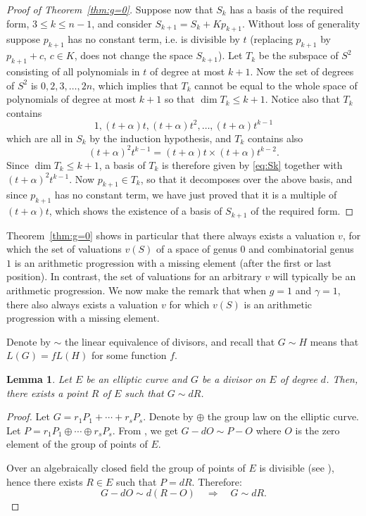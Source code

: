 \documentclass{article}
\theoremstyle{plain}
\newtheorem{lemma}[thm]{Lemma}
\theoremstyle{definition}
\theoremstyle{remark}
\renewcommand{\leq}{\leqslant}
\begin{document}
\begin{proof}[Proof of Theorem~\ref{thm:g=0}]
Suppose now that $S_k$ has a basis of the required form, $3\leq k\leq n-1$, and
consider $S_{k+1}=S_k+Kp_{k+1}$. Without loss of generality suppose
$p_{k+1}$ has no constant term, i.e. is divisible by $t$ (replacing
$p_{k+1}$ by $p_{k+1}+c$, $c\in K$, does not change the space $S_{k+1}$).
Let $T_k$ be the subspace
of $S^2$ consisting of all polynomials in $t$ of degree at most
$k+1$. Now the set of degrees of $S^2$ is
$0,2,3,\ldots,2n$, which implies that $T_k$ cannot be equal to the
whole space of polynomials of degree at most $k+1$ so that $\dim T_k\leq k+1$.
Notice also that $T_k$ contains
\begin{equation}
  \label{eq:Sk}
  1,(t+\alpha)t,(t+\alpha)t^2,\ldots ,(t+\alpha)t^{k-1}
\end{equation}
which are all in $S_k$ by the induction hypothesis, and $T_k$
contains also 
$$(t+\alpha)^2t^{k-1} = (t+\alpha)t \times (t+\alpha)t^{k-2}.$$
Since $\dim T_k\leq k+1$, a basis of $T_k$ is therefore given by \eqref{eq:Sk} together with $(t+\alpha)^2t^{k-1}$. Now $p_{k+1}\in T_k$, so that it decomposes over the above basis,
and since $p_{k+1}$ has no constant term, we have just proved that
it is a multiple of $(t+\alpha)t$, which shows the existence of a basis of $S_{k+1}$ of the required form.
\end{proof}


Theorem~\ref{thm:g=0} shows in particular that there always exists a
valuation $v$, for which the set of valuations $v(S)$ of a space of
genus $0$ and combinatorial genus $1$ is an arithmetic
progression with a missing element (after the first or last position).
In contrast, the set of valuations for an arbitrary $v$ will typically
be an arithmetic progression. 
We now make the remark that when $g=1$ and $\gamma=1$, 
there also always exists a valuation $v$ for which $v(S)$ is an arithmetic
progression with a missing element.

Denote by $\sim$ the linear equivalence of divisors, and recall that
$G \sim H$
means that $L(G) = fL(H)$ for some function $f$.

\begin{lemma}\label{lem:one_point}
  Let $E$ be an elliptic curve and $G$ be a divisor on $E$ of degree $d$.
  Then, there exists a point $R$ of $E$ such that $G \sim dR$.
\end{lemma}

\begin{proof}
  Let $G = r_1 P_1 + \cdots + r_s P_s$. Denote by $\oplus$ the group law
  on the elliptic curve. Let $P = r_1P_1 \oplus \cdots \oplus r_s P_s$.
  From \cite[Proposition III.3.4]{Silverman}, we get
  $
  G - dO \sim P-O
  $
  where $O$ is the zero element of the group of points of $E$.
  
  Over an algebraically closed field the group of points of $E$ is divisible
  (see \cite[Theorem 4.10(a)]{Silverman}),
  hence there exists $R \in E$ such that $P = dR$. Therefore:
  $$
  G-dO \sim d(R-O)\quad \Longrightarrow \quad G \sim dR.
  $$
\end{proof}
\end{document}
